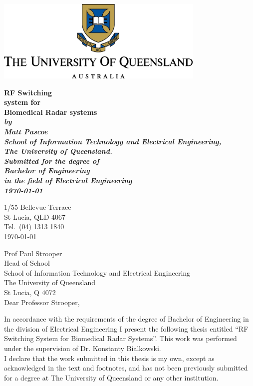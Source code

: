 \documentclass[12pt,openany,a4paper]{book}
\renewcommand{\baselinestretch}{1.2}	%
\begin{document}
\frontmatter

\begin{titlepage}
	\centering
	\includegraphics[width=10cm]{UQLogo.png}
\renewcommand{\baselinestretch}{1.0}
\begin{center}
\vspace*{15mm}
\Huge\bf
		RF Switching\\ system for\\ Biomedical Radar systems \\
\vspace{20mm}
\large\sl
		by\\
		Matt Pascoe
		\medskip\\
\rm
		School of Information Technology and Electrical Engineering,\\
		The University of Queensland.\\
\vspace{30mm}
		Submitted for the degree of\\
		Bachelor of Engineering
		\smallskip\\
\normalsize
		in the field of Electrical Engineering 
		\medskip\\
\large
		\today		
\end{center}
\end{titlepage}
\newpage



\begin{flushright}
	1/55 Bellevue Terrace\\
	St Lucia, QLD  4067\\
	Tel.\ (04) 1313 1840\\
	\medskip
	\today
\end{flushright}
\begin{flushleft}
  Prof Paul Strooper\\
  Head of School\\
  School of Information Technology and Electrical Engineering\\
  The University of Queensland\\
  St Lucia, Q 4072\\
  \bigskip\bigskip
  Dear Professor Strooper,
\end{flushleft}
In accordance with the requirements of the degree of Bachelor of
Engineering in the division of Electrical Engineering I present the
following thesis entitled ``RF Switching System for Biomedical Radar 
Systems''.  This work was performed under the supervision of
Dr. Konstanty Bialkowski. \\
I declare that the work submitted in this thesis is my own, except as
acknowledged in the text and footnotes, and has not been previously
submitted for a degree at The University of Queensland or any other
institution.
\end{document}
